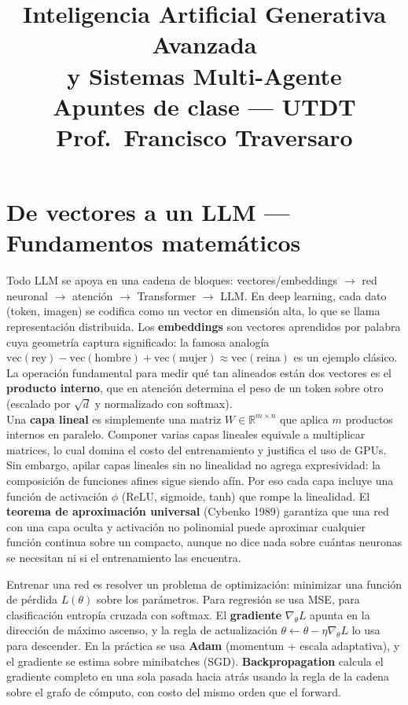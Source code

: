 \documentclass[11pt,a4paper]{article}
\title{\textbf{Inteligencia Artificial Generativa Avanzada\\y Sistemas Multi-Agente}\\[0.5em]
\large Apuntes de clase --- UTDT\\
Prof.\ Francisco Traversaro}
\author{}
\date{}
\begin{document}
\maketitle

\section{De vectores a un LLM --- Fundamentos matem\'aticos}

Todo LLM se apoya en una cadena de bloques: vectores/embeddings $\to$ red neuronal $\to$ atenci\'on $\to$ Transformer $\to$ LLM. En deep learning, cada dato (token, imagen) se codifica como un vector en dimensi\'on alta, lo que se llama representaci\'on distribuida. Los \textbf{embeddings} son vectores aprendidos por palabra cuya geometr\'ia captura significado: la famosa analog\'ia $\text{vec}(\text{rey}) - \text{vec}(\text{hombre}) + \text{vec}(\text{mujer}) \approx \text{vec}(\text{reina})$ es un ejemplo cl\'asico. La operaci\'on fundamental para medir qu\'e tan alineados est\'an dos vectores es el \textbf{producto interno}, que en atenci\'on determina el peso de un token sobre otro (escalado por $\sqrt{d}$ y normalizado con softmax). \\[1ex]

Una \textbf{capa lineal} es simplemente una matriz $W \in \mathbb{R}^{m \times n}$ que aplica $m$ productos internos en paralelo. Componer varias capas lineales equivale a multiplicar matrices, lo cual domina el costo del entrenamiento y justifica el uso de GPUs. Sin embargo, apilar capas lineales sin no linealidad no agrega expresividad: la composici\'on de funciones afines sigue siendo af\'in. Por eso cada capa incluye una funci\'on de activaci\'on $\phi$ (ReLU, sigmoide, tanh) que rompe la linealidad. El \textbf{teorema de aproximaci\'on universal} (Cybenko 1989) garantiza que una red con una capa oculta y activaci\'on no polinomial puede aproximar cualquier funci\'on continua sobre un compacto, aunque no dice nada sobre cu\'antas neuronas se necesitan ni si el entrenamiento las encuentra.

Entrenar una red es resolver un problema de optimizaci\'on: minimizar una funci\'on de p\'erdida $L(\theta)$ sobre los par\'ametros. Para regresi\'on se usa MSE, para clasificaci\'on entrop\'ia cruzada con softmax. El \textbf{gradiente} $\nabla_\theta L$ apunta en la direcci\'on de m\'aximo ascenso, y la regla de actualizaci\'on $\theta \leftarrow \theta - \eta \nabla_\theta L$ lo usa para descender. En la pr\'actica se usa \textbf{Adam} (momentum + escala adaptativa), y el gradiente se estima sobre minibatches (SGD). \textbf{Backpropagation} calcula el gradiente completo en una sola pasada hacia atr\'as usando la regla de la cadena sobre el grafo de c\'omputo, con costo del mismo orden que el forward. \\[1ex]
\end{document}
